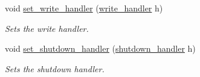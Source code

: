 \begin{DoxyCompactItemize}
void \hyperlink{classwebsocketpp_1_1transport_1_1iostream_1_1connection_a32740c33406e5484da7f030fb106ae22}{set\+\_\+write\+\_\+handler} (\hyperlink{namespacewebsocketpp_1_1transport_1_1iostream_abc22b834c2d0c698d6c87e51d5bfad2c}{write\+\_\+handler} h)
\begin{DoxyCompactList}\small\item\em Sets the write handler. \end{DoxyCompactList}\item 
void \hyperlink{classwebsocketpp_1_1transport_1_1iostream_1_1connection_a37bb9ef90b3d183c238a32cf9f056d4b}{set\+\_\+shutdown\+\_\+handler} (\hyperlink{namespacewebsocketpp_1_1transport_1_1iostream_a3563ce2cca06b1466f7d76ecb8eb4a0b}{shutdown\+\_\+handler} h)
\begin{DoxyCompactList}\small\item\em Sets the shutdown handler. \end{DoxyCompactList}\end{DoxyCompactItemize}
